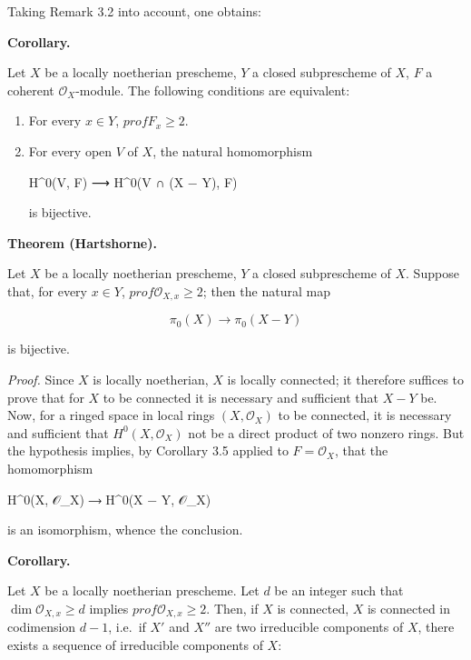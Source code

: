 \documentclass[
  11pt,
  a4paper,
]{book}
\newenvironment{Shaded}{}{}
\newcommand{\NormalTok}[1]{#1}
\begin{document}
Taking Remark 3.2 into account, one obtains:

\textbf{Corollary.}

Let \(X\) be a locally noetherian prescheme, \(Y\) a closed subprescheme
of \(X\), \(F\) a coherent \(\mathcal{O}_{X}\)-module. The following
conditions are equivalent:

\begin{enumerate}
\def\labelenumi{\arabic{enumi}.}
\item
  For every \(x \in Y\), \(prof F_{x} \geqslant 2\).
\item
  For every open \(V\) of \(X\), the natural homomorphism

\begin{Shaded}
\begin{Highlighting}[]
\NormalTok{H\^{}0(V, F) ⟶ H\^{}0(V ∩ (X − Y), F)}
\end{Highlighting}
\end{Shaded}

  is bijective.
\end{enumerate}

\textbf{Theorem (Hartshorne).}

Let \(X\) be a locally noetherian prescheme, \(Y\) a closed subprescheme
of \(X\). Suppose that, for every \(x \in Y\), \(prof
\mathcal{O}_{X,x} \geqslant 2\); then the natural map

\[ \pi_{0}(X) \longrightarrow \pi_{0}(X - Y) \]

is bijective.

\emph{Proof.} Since \(X\) is locally noetherian, \(X\) is locally
connected; it therefore suffices to prove that for \(X\) to be connected
it is necessary and sufficient that \(X - Y\) be. Now, for a ringed
space in local rings \((X, \mathcal{O}_{X})\) to be connected, it is
necessary and sufficient that \(H^{0}(X, \mathcal{O}_{X})\) not be a
direct product of two nonzero rings. But the hypothesis implies, by
Corollary 3.5 applied to \(F = \mathcal{O}_{X}\), that the homomorphism

\begin{Shaded}
\begin{Highlighting}[]
\NormalTok{H\^{}0(X, 𝒪\_X) ⟶ H\^{}0(X − Y, 𝒪\_X)}
\end{Highlighting}
\end{Shaded}

is an isomorphism, whence the conclusion.

\textbf{Corollary.}

Let \(X\) be a locally noetherian prescheme. Let \(d\) be an integer
such that \(\dim \mathcal{O}_{X,x} \geqslant d\) implies
\(prof \mathcal{O}_{X,x} \geqslant 2\). Then, if \(X\) is connected,
\(X\) is connected in codimension \(d - 1\), i.e.~if \(X'\) and \(X''\)
are two irreducible components of \(X\), there exists a sequence of
irreducible components of \(X\):
\end{document}
